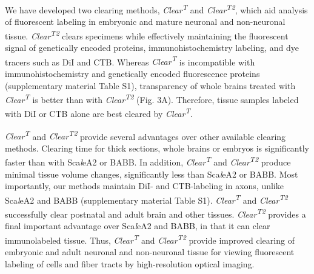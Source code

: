 We have developed two clearing methods, \emph{Clear\textsuperscript{T}} and \emph{Clear\textsuperscript{T2}}, which aid analysis of fluorescent labeling in embryonic and mature neuronal and non-neuronal tissue.
\emph{Clear\textsuperscript{T2}} clears specimens while effectively maintaining the fluorescent signal of genetically encoded proteins, immunohistochemistry labeling, and dye tracers such as DiI and CTB.
Whereas \emph{Clear\textsuperscript{T}} is incompatible with immunohistochemistry and genetically encoded fluorescence proteins (supplementary material Table S1), transparency of whole brains treated with \emph{Clear\textsuperscript{T}} is better than with \emph{Clear\textsuperscript{T2}} (Fig. 3A).
Therefore, tissue samples labeled with DiI or CTB alone are best cleared by \emph{Clear\textsuperscript{T}}.

\emph{Clear\textsuperscript{T}} and \emph{Clear\textsuperscript{T2}} provide several advantages over other available clearing methods.
Clearing time for thick sections, whole brains or embryos is significantly faster than with Sca\emph{l}eA2 or BABB.
In addition, \emph{Clear\textsuperscript{T}} and \emph{Clear\textsuperscript{T2}} produce minimal tissue volume changes, significantly less than Sca\emph{l}eA2 or BABB.
Most importantly, our methods maintain DiI- and CTB-labeling in axons, unlike Sca\emph{l}eA2 and BABB (supplementary material Table S1).
\emph{Clear\textsuperscript{T}} and \emph{Clear\textsuperscript{T2}} successfully clear postnatal and adult brain and other tissues.
\emph{Clear\textsuperscript{T2}} provides a final important advantage over Sca\emph{l}eA2 and BABB, in that it can clear immunolabeled tissue.
Thus, \emph{Clear\textsuperscript{T}} and \emph{Clear\textsuperscript{T2}} provide improved clearing of embryonic and adult neuronal and non-neuronal tissue for viewing fluorescent labeling of cells and fiber tracts by high-resolution optical imaging.